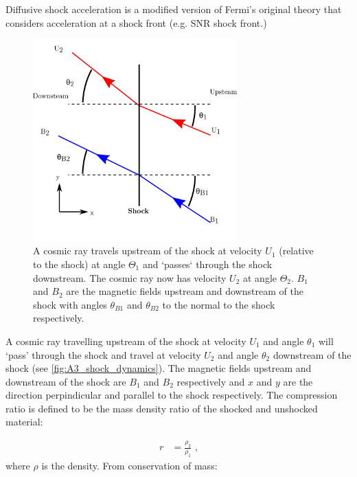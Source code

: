 Diffusive shock acceleration is a modified version of Fermi's original theory that considers acceleration at a shock front (e.g. SNR shock front.)
\begin{figure}
	\centering
	\includegraphics[width=0.7\textwidth]{A3_Diffusive_Shock_Acceleration/Images/shock_dynamics.png}
	\caption{A cosmic ray travels upstream of the shock at velocity $U_1$ (relative to the shock) at angle $\Theta_1$ and `passes` through the shock downstream. The cosmic ray now has velocity $U_2$ at angle $\Theta_2$. $B_1$ and $B_2$ are the magnetic fields upstream and downstream of the shock with angles $\theta_{B1}$ and $\theta_{B2}$ to the normal to the shock respectively.}
	\label{fig:A3_shock_dynamics}
\end{figure}
\par 
A cosmic ray travelling upstream of the shock at velocity $U_1$ and angle $\theta_1$ will `pass' through the shock and travel at velocity $U_2$ and angle $\theta_2$ downstream of the shock (see \autoref{fig:A3_shock_dynamics}). The magnetic fields upstream and downstream of the shock are $B_1$ and $B_2$ respectively and $x$ and $y$ are the direction perpindicular and parallel to the shock respectively. The compression ratio is defined to be the mass density ratio of the shocked and unshocked material:

\begin{equation}
    \begin{aligned}
        r&=\frac{\rho_2}{\rho_1}\text{ ,}
    \end{aligned}
\end{equation}
\noindent where $\rho$ is the density. From conservation of mass:

